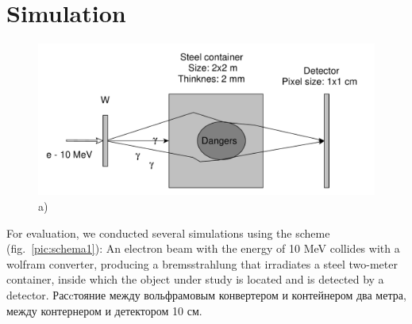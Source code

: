 \documentclass[a4paper]{panl}
\begin{document}
\section*{Simulation}
\begin{figure}[t]
    \begin{center}
        \includegraphics[width=120mm]{figures/yed_schema_1.pdf}
        \vspace{-3mm}
        \caption{a) }
    \end{center}
    \vspace{-5mm}
\end{figure}
For evaluation, we conducted several simulations using the scheme (fig.~\ref{pic:schema1}):
An electron beam with the energy of 10 MeV collides with a wolfram converter, producing a bremsstrahlung that irradiates a steel two-meter container, inside which the object under study is located and is detected by a detector. Расcтояние между вольфрамовым конвертером и контейнером два метра, между контернером и детектором 10 см. 
\end{document}
